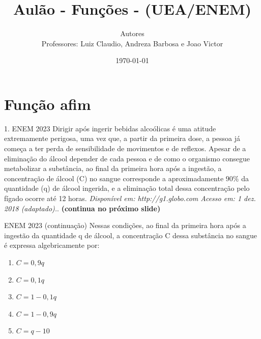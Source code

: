 \documentclass[11pt]{beamer}
\author[CETi / IFAM CMC]{Autores \\ Professores: Luiz Claudio, Andreza Barbosa e Joao Victor}
\title{Aulão - Funções - (UEA/ENEM)}
\institute[]{CETi BILÍNGUE GILBERTO MESTRINHO \par INSTITUTO FEDERAL DO AMAZONAS }
\date{\today}
\begin{document}
\justifying
\onehalfspacing 

\begin{frame}
    \titlepage
\end{frame}

\section{Função afim}

\begin{frame}{1. ENEM 2023}
    Dirigir após ingerir bebidas alcoólicas é uma atitude extremamente perigosa, uma vez que, a partir da primeira dose, a pessoa já começa a ter perda de sensibilidade de movimentos e de reflexos. Apesar de a eliminação do álcool depender de cada pessoa e de como o organismo consegue metabolizar a substância, ao final da primeira hora após a ingestão, a concentração de álcool (C) no sangue corresponde a aproximadamente $90\%$ da quantidade (q) de álcool ingerida, e a eliminação total dessa concentração pelo fígado ocorre até 12 horas. \textit{Disponível em: http://g1.globo.com Acesso em: 1 dez. 2018 (adaptado).}. \vfill
    \textbf{(continua no próximo slide)}
\end{frame}

\begin{frame}{ENEM 2023 (continuação)}
    Nessas condições, ao final da primeira hora após a ingestão da quantidade q de álcool, a concentração C dessa substância no sangue é expressa algebricamente por:

    \begin{enumerate}[a]
                \item $C = 0,9q$ %
                \item $C = 0,1q$
                \item $C = 1 - 0,1q$
                \item $C = 1 - 0,9q$ 
                \item $C = q - 10$
            \end{enumerate}
\end{frame}
\end{document}

